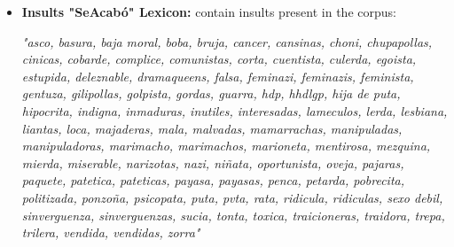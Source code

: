 \begin{itemize}
    \item \textbf{Insults "SeAcabó" Lexicon:} contain insults present in the corpus:
    
        \textit{"asco,
                basura,
                baja moral,
                boba,
                bruja,
                cancer,
                cansinas,
                choni,
                chupapollas,
                cinicas,
                cobarde,
                complice,
                comunistas,
                corta,
                cuentista,
                culerda,
                egoista,
                estupida,
                deleznable,
                dramaqueens,
                falsa,
                feminazi,
                feminazis,
                feminista,
                gentuza,
                gilipollas,
                golpista,
                gordas,
                guarra,
                hdp,
                hhdlgp,
                hija de puta,
                hipocrita,
                indigna,
                inmaduras,
                inutiles,
                interesadas,
                lameculos,
                lerda,
                lesbiana,
                liantas,
                loca,
                majaderas,
                mala,
                malvadas,
                mamarrachas,
                manipuladas,
                manipuladoras,
                marimacho,
                marimachos,
                marioneta,
                mentirosa,
                mezquina,
                mierda,
                miserable,
                narizotas,
                nazi,
                niñata,
                oportunista,
                oveja,
                pajaras,
                paquete,
                patetica,
                pateticas,
                payasa,
                payasas,
                penca,
                petarda,
                pobrecita,
                politizada,
                ponzoña,
                psicopata,
                puta,
                pvta,
                rata,
                ridicula,
                ridiculas,
                sexo debil,
                sinverguenza,
                sinverguenzas,
                sucia,
                tonta,
                toxica,
                traicioneras,
                traidora,
                trepa,
                trilera,
                vendida,
                vendidas,
                zorra"}
\end{itemize}


